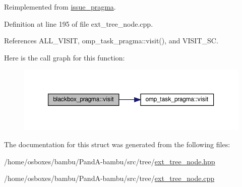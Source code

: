 Reimplemented from \hyperlink{structissue__pragma_afc993f822027243a8112c2b3f07bb17a}{issue\+\_\+pragma}.



Definition at line 195 of file ext\+\_\+tree\+\_\+node.\+cpp.



References A\+L\+L\+\_\+\+V\+I\+S\+IT, omp\+\_\+task\+\_\+pragma\+::visit(), and V\+I\+S\+I\+T\+\_\+\+SC.

Here is the call graph for this function\+:
\nopagebreak
\begin{figure}[H]
\begin{center}
\leavevmode
\includegraphics[width=350pt]{d5/d3c/structblackbox__pragma_a8e85a8856e83d67730225e4a1e3297b9_cgraph}
\end{center}
\end{figure}


The documentation for this struct was generated from the following files\+:\begin{DoxyCompactItemize}
\item 
/home/osboxes/bambu/\+Pand\+A-\/bambu/src/tree/\hyperlink{ext__tree__node_8hpp}{ext\+\_\+tree\+\_\+node.\+hpp}\item 
/home/osboxes/bambu/\+Pand\+A-\/bambu/src/tree/\hyperlink{ext__tree__node_8cpp}{ext\+\_\+tree\+\_\+node.\+cpp}\end{DoxyCompactItemize}
